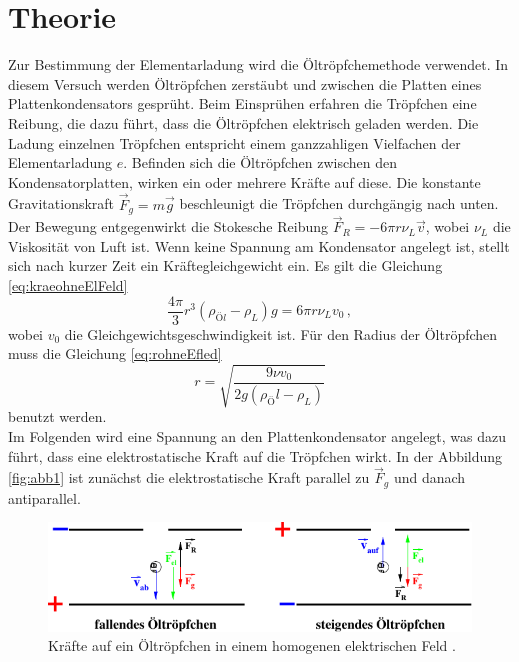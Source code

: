 \section{Theorie}
\label{sec:Theorie}

Zur Bestimmung der Elementarladung wird die Öltröpfchemethode verwendet. In diesem Versuch werden Öltröpfchen zerstäubt und zwischen die Platten eines Plattenkondensators gesprüht.
Beim Einsprühen erfahren die Tröpfchen eine Reibung, die dazu führt, dass die Öltröpfchen elektrisch geladen werden.
Die Ladung einzelnen Tröpfchen entspricht einem ganzzahligen Vielfachen der Elementarladung $e$.
Befinden sich die Öltröpfchen zwischen den Kondensatorplatten, wirken ein oder mehrere Kräfte auf diese. 
Die konstante Gravitationskraft $\vec{F}_g = m \vec{g}$ beschleunigt die Tröpfchen durchgängig nach unten.
Der Bewegung entgegenwirkt die Stokesche Reibung $\vec{F}_R = -6 \pi r \nu_L \vec{v}$, wobei $\nu_L$ die Viskosität von Luft ist.
Wenn keine Spannung am Kondensator angelegt ist, stellt sich nach kurzer Zeit ein Kräftegleichgewicht ein.
Es gilt die Gleichung \eqref{eq:kraeohneElFeld}
\begin{equation}
    \frac{4 \pi}{3} r^3(\rho_{Öl} - \rho_L)g = 6 \pi r \nu_L v_0 \, ,
    \label{eq:kraeohneElFeld}
\end{equation}
wobei $v_0$ die Gleichgewichtsgeschwindigkeit ist. Für den Radius der Öltröpfchen muss die Gleichung \eqref{eq:rohneEfled}
\begin{equation}
    r = \sqrt{\frac{9 \nu v_0}{2 g (\rho_Öl - \rho_L)}}
    \label{eq:rohneEfled}
\end{equation}
benutzt werden.\\

Im Folgenden wird eine Spannung an den Plattenkondensator angelegt, was dazu führt, dass eine elektrostatische Kraft auf die Tröpfchen wirkt.
In der Abbildung \autoref{fig:abb1} ist zunächst die elektrostatische Kraft parallel zu $\vec{F}_g$ und danach antiparallel.


\begin{figure}[H]
    \centering
    \includegraphics{figures/Abb1.pdf}
    \caption{Kräfte auf ein Öltröpfchen in einem homogenen elektrischen Feld \cite{ap12}.}
    \label{fig:abb1}
\end{figure}



